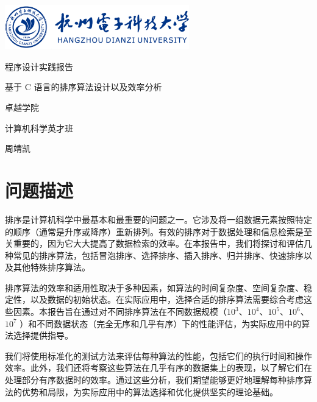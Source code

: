 \documentclass[12pt]{article}
\begin{document}
\begin{titlepage}


\parbox[c]{0pt}{
    \includegraphics[width=8cm]{hdu.png}
}

\setlength{\parindent}{0pt}
\centering
\vfill
{ \heiti \textcolor{xblue}{程序设计实践报告}\par}
\vspace{10pt}
{ \heiti 基于 C 语言的排序算法设计以及效率分析\par}
\vfill
{\large \heiti 卓越学院\par
计算机科学英才班\par
周靖凯\par
}
\vfill
\restoregeometry

\end{titlepage}

\renewcommand\contentsname{\textcolor{xblue}{目录}}
    \tableofcontents
\clearpage

\setcounter{page}{1}

\section{问题描述}

排序是计算机科学中最基本和最重要的问题之一。它涉及将一组数据元素按照特定的顺序（通常是升序或降序）重新排列。有效的排序对于数据处理和信息检索是至关重要的，因为它大大提高了数据检索的效率。在本报告中，我们将探讨和评估几种常见的排序算法，包括冒泡排序、选择排序、插入排序、归并排序、快速排序以及其他特殊排序算法。

排序算法的效率和适用性取决于多种因素，如算法的时间复杂度、空间复杂度、稳定性，以及数据的初始状态。在实际应用中，选择合适的排序算法需要综合考虑这些因素。本报告旨在通过对不同排序算法在不同数据规模（$10^3$、$10^4$、$10^5$、$10^6$、$10^7$ ）和不同数据状态（完全无序和几乎有序）下的性能评估，为实际应用中的算法选择提供指导。

我们将使用标准化的测试方法来评估每种算法的性能，包括它们的执行时间和操作效率。此外，我们还将考察这些算法在几乎有序的数据集上的表现，以了解它们在处理部分有序数据时的效率。通过这些分析，我们期望能够更好地理解每种排序算法的优势和局限，为实际应用中的算法选择和优化提供坚实的理论基础。
\end{document}
